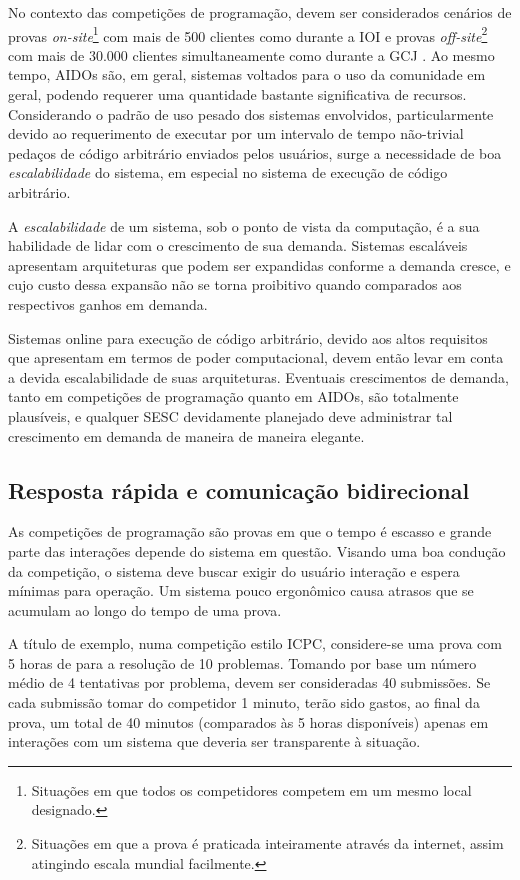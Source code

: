 \documentclass[ruledheader, 12pt]{abnt}
\begin{document}
No contexto das competições de programação, devem ser considerados cenários de provas \emph{on-site}\footnote{Situações em que todos os competidores competem em um mesmo local designado.} com mais de 500 clientes como durante a IOI \cite{ioi-nl1-2007} e provas \emph{off-site}\footnote{Situações em que a prova é praticada inteiramente através da internet, assim atingindo escala mundial facilmente.} com mais de 30.000 clientes simultaneamente como durante a GCJ \cite{googlecodejamhistory}. Ao mesmo tempo, AIDOs são, em geral, sistemas voltados para o uso da comunidade em geral, podendo requerer uma quantidade bastante significativa de recursos. Considerando o padrão de uso pesado dos sistemas envolvidos, particularmente devido ao requerimento de executar por um intervalo de tempo não-trivial pedaços de código arbitrário enviados pelos usuários, surge a necessidade de boa \emph{escalabilidade} do sistema, em especial no sistema de execução de código arbitrário.

A \emph{escalabilidade} de um sistema, sob o ponto de vista da computação, é a sua habilidade de lidar com o crescimento de sua demanda. Sistemas escaláveis apresentam arquiteturas que podem ser expandidas conforme a demanda cresce, e cujo custo dessa expansão não se torna proibitivo quando comparados aos respectivos ganhos em demanda.

Sistemas online para execução de código arbitrário, devido aos altos requisitos que apresentam em termos de poder computacional, devem então levar em conta a devida escalabilidade de suas arquiteturas. Eventuais crescimentos de demanda, tanto em competições de programação quanto em AIDOs, são totalmente plausíveis, e qualquer SESC devidamente planejado deve administrar tal crescimento em demanda de maneira de maneira elegante.

\subsection{Resposta rápida e comunicação bidirecional}

As competições de programação são provas em que o tempo é escasso e grande parte das interações depende do sistema em questão. Visando uma boa condução da competição, o sistema deve buscar exigir do usuário interação e espera mínimas para operação. Um sistema pouco ergonômico causa atrasos que se acumulam ao longo do tempo de uma prova.

A título de exemplo, numa competição estilo ICPC, considere-se uma prova com 5 horas de para a resolução de 10 problemas. Tomando por base um número médio de 4 tentativas por problema, devem ser consideradas 40 submissões. Se cada submissão tomar do competidor 1 minuto, terão sido gastos, ao final da prova, um total de 40 minutos (comparados às 5 horas disponíveis) apenas em interações com um sistema que deveria ser transparente à situação.
\end{document}
